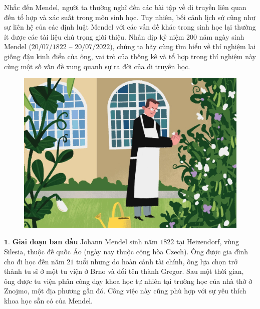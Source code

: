 \begin{multicols}{2}
	Nhắc đến Mendel, người ta thường nghĩ đến các bài tập về di truyền liên quan đến tổ hợp và xác suất trong môn sinh học. Tuy nhiên, bối cảnh lịch sử cũng như sự liên hệ của các định luật Mendel với các vấn đề khác trong sinh học lại thường ít được các tài liệu chú trọng giới thiệu. Nhân dịp kỷ niệm $200$ năm ngày sinh Mendel ($20/07/1822$ -- $20/07/2022$), chúng ta hãy cùng tìm hiểu về thí nghiệm lai giống đậu kinh điển của ông, vai trò của thống kê và tổ hợp trong thí nghiệm này cùng một số vấn đề xung quanh sự ra đời của di truyền học.
	\begin{figure}[H]
		\centering
		\vspace*{-5pt}
		\captionsetup{labelformat= empty, justification=centering}
		\includegraphics[width=1\linewidth]{image011}
		\vspace*{-15pt}
	\end{figure}
	$\pmb{1.}$ \textbf{\color{timhieukhoahoc}Giai đoạn ban đầu}
	\vskip 0.1cm
	Johann Mendel sinh năm $1822$ tại Heizendorf, vùng Silesia, thuộc đế quốc Áo (ngày nay thuộc cộng hòa Czech). Ông được gia đình cho đi học đến năm $21$ tuổi nhưng do hoàn cảnh tài chính, ông lựa chọn trở thành tu sĩ ở một tu viện ở Brno và đổi tên thành Gregor.
	\vskip 0.1cm
	Sau một thời gian, ông được tu viện phân công dạy khoa học tự nhiên tại trường học của nhà thờ ở Znojmo, một địa phương gần đó. Công việc này cũng phù hợp với sự yêu thích khoa học sẵn có của Mendel. 
	\vskip 0.1cm

\end{multicols}
